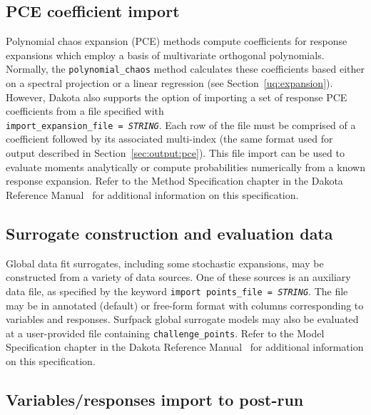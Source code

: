 \subsection{PCE coefficient import}

Polynomial chaos expansion (PCE) methods compute coefficients for
response expansions which employ a basis of multivariate orthogonal
polynomials.  Normally, the \texttt{polynomial\_chaos} method
calculates these coefficients based either on a spectral projection or
a linear regression (see Section~\ref{uq:expansion}).  However, Dakota
also supports the option of importing a set of response PCE
coefficients from a file specified with \\
\texttt{import\_expansion\_file = \emph{STRING}}.  Each row of the
file must be comprised of a coefficient followed by its associated
multi-index (the same format used for output described in
Section~\ref{sec:output:pce}).  This file import can be used to
evaluate moments analytically or compute probabilities numerically
from a known response expansion.  Refer to the Method Specification
chapter in the Dakota Reference Manual~\cite{RefMan} for additional
information on this specification.

\subsection{Surrogate construction and evaluation data}

Global data fit surrogates, including some stochastic expansions, may
be constructed from a variety of data sources.  One of these sources
is an auxiliary data file, as specified by the keyword \texttt{import\
  points\_file = \emph{STRING}}.  The file may be in annotated
(default) or free-form format with columns corresponding to variables
and responses.  Surfpack global surrogate models may also be evaluated
at a user-provided file containing \texttt{challenge\_points}.  Refer
to the Model Specification chapter in the Dakota Reference
Manual~\cite{RefMan} for additional information on this specification.

\subsection{Variables/responses import to post-run}

